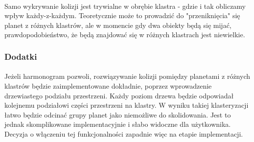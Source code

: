 \paragraph{}

Samo wykrywanie kolizji jest trywialne w obrębie klastra - gdzie i tak obliczamy wpływ każdy-z-każdym. Teoretycznie może to prowadzić do "przeniknięcia" się planet z różnych klastrów, ale w momencie gdy dwa obiekty będą się mijać, prawdopodobieństwo, że będą znajdować się w różnych klastrach jest niewielkie.

\subsubsection{Dodatki}\label{alg:additions}

\paragraph{}
Jeżeli harmonogram pozwoli, rozwiązywanie kolizji pomiędzy planetami z różnych klastrów będzie zaimplementowane dokładnie, poprzez wprowadzenie drzewiastego podziału przestrzeni. Każdy poziom drzewa będzie odpowiadał kolejnemu podziałowi części przestrzeni na klastry. W wyniku takiej klasteryzacji łatwo będzie odcinać grupy planet jako niemożliwe do skolidowania. Jest to jednak skomplikowane implementacyjnie i słabo widoczne dla użytkownika. Decyzja o włączeniu tej funkcjonalności zapadnie więc na etapie implementacji.
